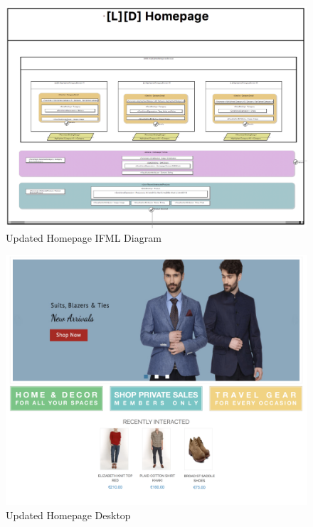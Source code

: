 \vspace{0.5cm}
\begin{figure}[H]
  \centering
    \includegraphics[width=16cm]{images/diagrams/after/ifml-homepage.png}
  \caption{Updated Homepage IFML Diagram}
  \label{fig:ifml-after-homepage}
\end{figure}

\begin{figure}[H]
  \centering
    \includegraphics[width=16cm]{images/diagrams/after/desktop-homepage.png}
  \caption{Updated Homepage Desktop}
  \label{fig:desktop-after-homepage}
\end{figure}
\vspace{0.5cm}

